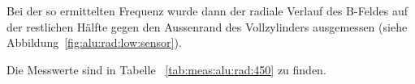 {\begin{minipage}[t]{0.33\textwidth}
        Bei    der     so    ermittelten     Frequenz    wurde     dann    der
        radiale   Verlauf   des   B-Feldes   auf   der   restlichen   H\"alfte
        gegen   den   Aussenrand    des   Vollzylinders   ausgemessen   (siehe
        Abbildung~\ref{fig:alu:rad:low:sensor}).

        Die   Messwerte  sind   in   Tabelle  ~\ref{tab:meas:alu:rad:450}   zu
        finden.



\end{minipage}}
